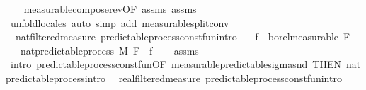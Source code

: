 \begin{isabellebody}
%
\isadelimproof
\ \ %
\endisadelimproof
%
\isatagproof
{}\isamarkupfalse%
\ measurable{\isacharunderscore}{\kern0pt}compose{\isacharunderscore}{\kern0pt}rev{\isacharbrackleft}{\kern0pt}OF\ assms{\isacharparenleft}{\kern0pt}{}{\isacharparenright}{\kern0pt}{\isacharbrackright}{\kern0pt}\ assms{\isacharparenleft}{\kern0pt}{}{\isacharparenright}{\kern0pt}\ \isamarkupfalse%
\ {\isacharparenleft}{\kern0pt}unfold{\isacharunderscore}{\kern0pt}locales{\isacharparenright}{\kern0pt}\ {\isacharparenleft}{\kern0pt}auto\ simp\ add{\isacharcolon}{\kern0pt}\ measurable{\isacharunderscore}{\kern0pt}split{\isacharunderscore}{\kern0pt}conv{\isacharparenright}{\kern0pt}%
\endisatagproof
{\isafoldproof}%
%
\isadelimproof
\isanewline
%
\endisadelimproof
\isanewline
{}\isamarkupfalse%
\ {\isacharparenleft}{\kern0pt}\ nat{\isacharunderscore}{\kern0pt}filtered{\isacharunderscore}{\kern0pt}measure{\isacharparenright}{\kern0pt}\ predictable{\isacharunderscore}{\kern0pt}process{\isacharunderscore}{\kern0pt}const{\isacharunderscore}{\kern0pt}fun{\isacharprime}{\kern0pt}{\isacharbrackleft}{\kern0pt}intro{\isacharbrackright}{\kern0pt}{\isacharcolon}{\kern0pt}\isanewline
\ \ \ {\isachardoublequoteopen}f\ {\isasymin}\ borel{\isacharunderscore}{\kern0pt}measurable\ {\isacharparenleft}{\kern0pt}F\ {}{\isacharparenright}{\kern0pt}{\isachardoublequoteclose}\isanewline
\ \ \ {\isachardoublequoteopen}nat{\isacharunderscore}{\kern0pt}predictable{\isacharunderscore}{\kern0pt}process\ M\ F\ {\isacharparenleft}{\kern0pt}{\isasymlambda}{\isacharunderscore}{\kern0pt}{\isachardot}{\kern0pt}\ f{\isacharparenright}{\kern0pt}{\isachardoublequoteclose}\isanewline
%
\isadelimproof
\ \ %
\endisadelimproof
%
\isatagproof
{}\isamarkupfalse%
\ assms\ \isamarkupfalse%
\ {\isacharparenleft}{\kern0pt}intro\ predictable{\isacharunderscore}{\kern0pt}process{\isacharunderscore}{\kern0pt}const{\isacharunderscore}{\kern0pt}fun{\isacharbrackleft}{\kern0pt}OF\ measurable{\isacharunderscore}{\kern0pt}predictable{\isacharunderscore}{\kern0pt}sigma{\isacharunderscore}{\kern0pt}snd{\isacharprime}{\kern0pt}{\isacharcomma}{\kern0pt}\ THEN\ nat{\isacharunderscore}{\kern0pt}predictable{\isacharunderscore}{\kern0pt}process{\isachardot}{\kern0pt}intro{\isacharbrackright}{\kern0pt}{\isacharparenright}{\kern0pt}%
\endisatagproof
{\isafoldproof}%
%
\isadelimproof
\isanewline
%
\endisadelimproof
\isanewline
{}\isamarkupfalse%
\ {\isacharparenleft}{\kern0pt}\ real{\isacharunderscore}{\kern0pt}filtered{\isacharunderscore}{\kern0pt}measure{\isacharparenright}{\kern0pt}\ predictable{\isacharunderscore}{\kern0pt}process{\isacharunderscore}{\kern0pt}const{\isacharunderscore}{\kern0pt}fun{\isacharprime}{\kern0pt}{\isacharbrackleft}{\kern0pt}intro{\isacharbrackright}{\kern0pt}{\isacharcolon}{\kern0pt}\isanewline

\end{isabellebody}
